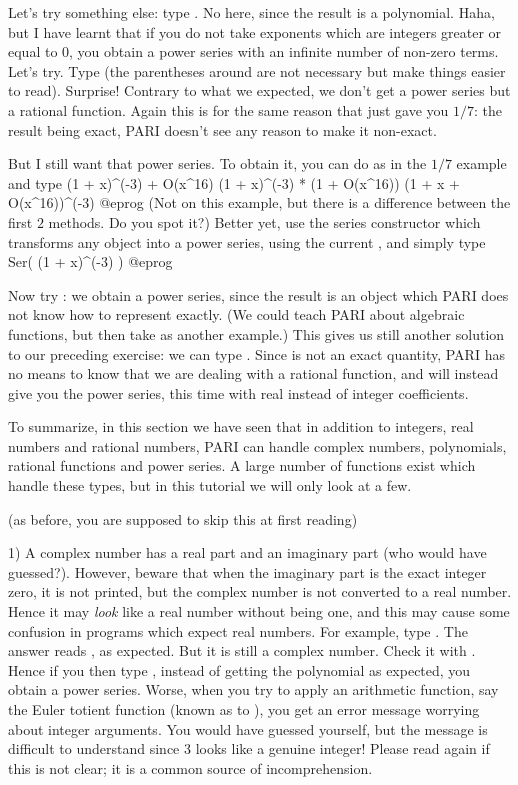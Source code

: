 Let's try something else: type . No  here, since
the result is a polynomial.  Haha, but I have learnt that if you do not take
exponents which are integers greater or equal to 0, you obtain a power series
with an infinite number of non-zero terms. Let's try.  Type
 (the parentheses around  are not necessary but
make things easier to read). Surprise! Contrary to what we expected, we don't
get a power series but a rational function. Again this is for the same reason
that  just gave you $1/7$: the result being exact, PARI doesn't see
any reason to make it non-exact.

But I still want that power series. To obtain it, you can do as in the $1/7$
example and type
\bprog
  (1 + x)^(-3) + O(x^16)
  (1 + x)^(-3) * (1 + O(x^16))
  (1 + x + O(x^16))^(-3)
@eprog\noindent
(Not on this example, but there is a difference between the first $2$
methods. Do you spot it?) Better yet, use the series constructor which
transforms any object into a power series, using the current
, and simply type
\bprog
  Ser( (1 + x)^(-3) )
@eprog

Now try : we obtain a power series, since the
result is an object which PARI does not know how to represent exactly. (We
could teach PARI about algebraic functions, but then take 
as another example.) This gives us still another solution to our preceding
exercise: we can type . Since  is not an exact
quantity, PARI has no means to know that we are dealing with a rational
function, and will instead give you the power series, this time with real
instead of integer coefficients.
\smallskip

To summarize, in this section we have seen that in addition to integers, real
numbers and rational numbers, PARI can handle complex numbers, polynomials,
rational functions and power series. A large number of functions exist which
handle these types, but in this tutorial we will only look at a few.

 (as before, you are supposed to skip this
at first reading)

1) A complex number has a real part and an imaginary part (who would have
guessed?). However, beware that when the imaginary part is the exact integer
zero, it is not printed, but the complex number is not converted to a real
number. Hence it may \emph{look} like a real number without being one, and
this may cause some confusion in programs which expect real numbers. For
example, type . The answer reads , as expected. But
it is still a complex number. Check it with . Hence if you then
type , instead of getting the polynomial  as expected, you obtain a power series. Worse, when you
try to apply an arithmetic function, say the Euler totient function (known as
 to ), you get an error message worrying about integer
arguments. You would have guessed yourself, but the message is difficult to
understand since 3 looks like a genuine integer! Please read again if this
is not clear; it is a common source of incomprehension.


